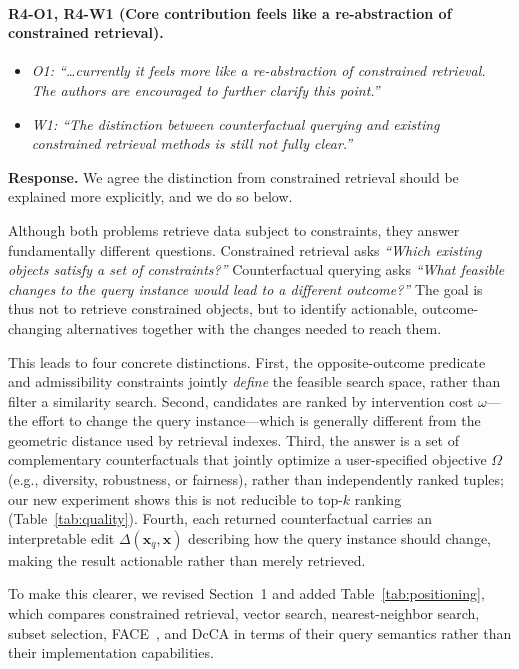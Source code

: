\paragraph{R4-O1, R4-W1 (Core contribution feels like a re-abstraction of constrained retrieval).}

\begin{itemize}[leftmargin=1.2em, itemsep=1pt, topsep=2pt]
\item \textit{O1: ``\dots currently it feels more like a re-abstraction of constrained retrieval. The authors are encouraged to further clarify this point.''}
\item \textit{W1: ``The distinction between counterfactual querying and existing constrained retrieval methods is still not fully clear.''}
\end{itemize}
\smallskip

\noindent\textbf{Response.}
We agree the distinction from constrained retrieval should be explained more explicitly, and we do so below.

Although both problems retrieve data subject to constraints, they answer fundamentally different questions. Constrained retrieval asks \emph{``Which existing objects satisfy a set of constraints?''} Counterfactual querying asks \emph{``What feasible changes to the query instance would lead to a different outcome?''} The goal is thus not to retrieve constrained objects, but to identify actionable, outcome-changing alternatives together with the changes needed to reach them.

This leads to four concrete distinctions. First, the opposite-outcome predicate and admissibility constraints jointly \emph{define} the feasible search space, rather than filter a similarity search. Second, candidates are ranked by intervention cost $\omega$---the effort to change the query instance---which is generally different from the geometric distance used by retrieval indexes. Third, the answer is a set of complementary counterfactuals that jointly optimize a user-specified objective $\Omega$ (e.g., diversity, robustness, or fairness), rather than independently ranked tuples; our new experiment shows this is not reducible to top-$k$ ranking (Table~\ref{tab:quality}). Fourth, each returned counterfactual carries an interpretable edit $\Delta(\mathbf{x}_q,\mathbf{x})$ describing how the query instance should change, making the result actionable rather than merely retrieved.

To make this clearer, we revised Section~1 and added Table~\ref{tab:positioning}, which compares constrained retrieval, vector search, nearest-neighbor search, subset selection, FACE~\cite{poyiadzi2020face}, and DcCA in terms of their query semantics rather than their implementation capabilities.

